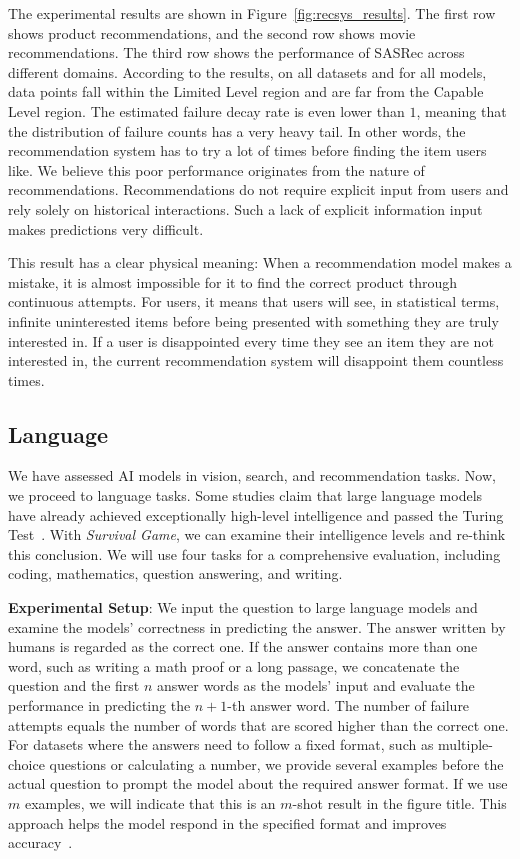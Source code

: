 The experimental results are shown in Figure~\ref{fig:recsys_results}. The first row shows product recommendations, and the second row shows movie recommendations. The third row shows the performance of SASRec across different domains. According to the results, on all datasets and for all models, data points fall within the Limited Level region and are far from the Capable Level region. The estimated failure decay rate is even lower than $1$, meaning that the distribution of failure counts has a very heavy tail. In other words, the recommendation system has to try a lot of times before finding the item users like. We believe this poor performance originates from the nature of recommendations. Recommendations do not require explicit input from users and rely solely on historical interactions. Such a lack of explicit information input makes predictions very difficult.

This result has a clear physical meaning: When a recommendation model makes a mistake, it is almost impossible for it to find the correct product through continuous attempts. For users, it means that users will see, in statistical terms, infinite uninterested items before being presented with something they are truly interested in. If a user is disappointed every time they see an item they are not interested in, the current recommendation system will disappoint them countless times.

\subsection{Language}

We have assessed AI models in vision, search, and recommendation tasks. Now, we proceed to language tasks. 
Some studies claim that large language models have already achieved exceptionally high-level intelligence and passed the Turing Test~\citep{biever2023chatgpt, aharoni2024attributions, mei2024turing}.
With \textit{Survival Game}, we can examine their intelligence levels and re-think this conclusion. We will use four tasks for a comprehensive evaluation, including coding, mathematics, question answering, and writing.

\textbf{Experimental Setup}: 
We input the question to large language models and examine the models' correctness in predicting the answer. 
The answer written by humans is regarded as the correct one. 
If the answer contains more than one word, such as writing a math proof or a long passage, we concatenate the question and the first $n$ answer words as the models' input and evaluate the performance in predicting the $n+1$-th answer word.
The number of failure attempts equals the number of words that are scored higher than the correct one. 
For datasets where the answers need to follow a fixed format, such as multiple-choice questions or calculating a number, we provide several examples before the actual question to prompt the model about the required answer format. If we use $m$ examples, we will indicate that this is an $m$-shot result in the figure title. This approach helps the model respond in the specified format and improves accuracy~\citep{brown2020language}.

